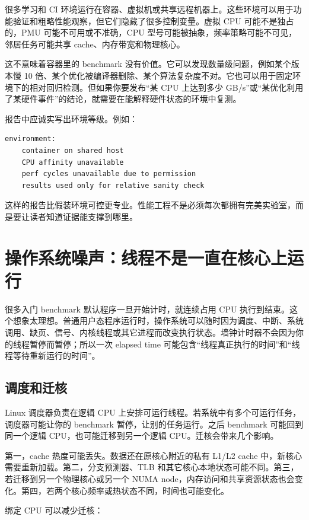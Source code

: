 很多学习和 CI 环境运行在容器、虚拟机或共享远程机器上。这些环境可以用于功能验证和粗略性能观察，但它们隐藏了很多控制变量。虚拟 CPU 可能不是独占的，PMU 可能不可用或不准确，CPU 型号可能被抽象，频率策略可能不可见，邻居任务可能共享 cache、内存带宽和物理核心。

这不意味着容器里的 benchmark 没有价值。它可以发现数量级问题，例如某个版本慢 10 倍、某个优化被编译器删除、某个算法复杂度不对。它也可以用于固定环境下的相对回归检测。但如果你要发布“某 CPU 上达到多少 GB/s”或“某优化利用了某硬件事件”的结论，就需要在能解释硬件状态的环境中复测。

报告中应诚实写出环境等级。例如：

\begin{lstlisting}
environment:
    container on shared host
    CPU affinity unavailable
    perf cycles unavailable due to permission
    results used only for relative sanity check
\end{lstlisting}

这样的报告比假装环境可控更专业。性能工程不是必须每次都拥有完美实验室，而是要让读者知道证据能支撑到哪里。

\section{操作系统噪声：线程不是一直在核心上运行}

很多入门 benchmark 默认程序一旦开始计时，就连续占用 CPU 执行到结束。这个想象太理想。普通用户态程序运行时，操作系统可以随时因为调度、中断、系统调用、缺页、信号、内核线程或其它进程而改变执行状态。墙钟计时器不会因为你的线程暂停而暂停；所以一次 elapsed time 可能包含“线程真正执行的时间”和“线程等待重新运行的时间”。

\subsection{调度和迁核}

Linux 调度器负责在逻辑 CPU 上安排可运行线程。若系统中有多个可运行任务，调度器可能让你的 benchmark 暂停，让别的任务运行。之后 benchmark 可能回到同一个逻辑 CPU，也可能迁移到另一个逻辑 CPU。迁核会带来几个影响。

第一，cache 热度可能丢失。数据还在原核心附近的私有 L1/L2 cache 中，新核心需要重新加载。第二，分支预测器、TLB 和其它核心本地状态可能不同。第三，若迁移到另一个物理核心或另一个 NUMA node，内存访问和共享资源状态也会变化。第四，若两个核心频率或热状态不同，时间也可能变化。

绑定 CPU 可以减少迁核：

